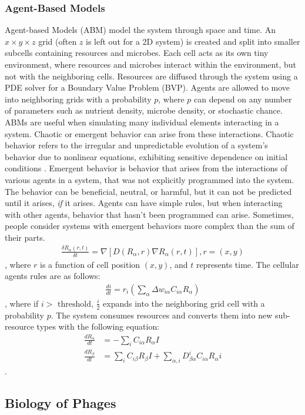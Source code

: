 \subsubsection{Agent-Based Models}
Agent-based Models (ABM) model the system through space and time.
 An $x \times y \times z$ grid (often $z$ is left out for a 2D system) is created and split into smaller subcells containing resources and microbes.
 Each cell acts as its own tiny environment, where resources and microbes interact within the environment, but not with the neighboring cells.
 Resources are diffused through the system using a PDE solver for a Boundary Value Problem (BVP).
 Agents are allowed to move into neighboring grids with a probability $p$, where $p$ can depend on any number of parameters such as nutrient density, microbe density, or stochastic chance. \newline 
ABMs are useful when simulating many individual elements interacting in a system.
 Chaotic or emergent behavior can arise from these interactions.
 Chaotic behavior refers to the irregular and unpredictable evolution of a system's behavior due to nonlinear equations, exhibiting sensitive dependence on initial conditions \cite{encyclopedia_of_physical_science_and_technology}. \newline 
Emergent behavior is behavior that arises from the interactions of various agents in a system, that was not explicitly programmed into the system.
 The behavior can be beneficial, neutral, or harmful, but it can not be predicted until it arises, \textit{if} it arises.
 Agents can have simple rules, but when interacting with other agents, behavior that hasn't been programmed can arise.
 Sometimes, people consider systems with emergent behaviors more complex than the sum of their parts. \newline
\begin{align} 
    \frac{\delta R_\alpha(r, t)}{\delta t} = \nabla \left[D \left( R_\alpha, r\right) \nabla R_\alpha \left( r, t \right) \right], r = \left(x, y\right)
\end{align}, where $r$ is a function of cell position $(x, y)$, and $t$ represents time. 
The cellular agents rules are as follows: 
\begin{align} 
    \frac{di}{dt} = r_i \left( \sum_\alpha \Delta w_{i\alpha}C_{i\alpha}R_\alpha\right)
\end{align}, where if $i> \text{ threshold, }\frac{i}{2}$ expands into the neighboring grid cell with a probability $p$. 
The system consumes resources and converts them into new sub-resource types with the following equation:
\begin{align}    
    \frac{dR_\alpha}{dt} &= -\sum_i C_{i\alpha}R_\alpha I \\
    \frac{dR_\beta}{dt} &= \sum_i C_{i\beta}R_\beta I + \sum_{\alpha, i}D_{\beta \alpha}^{i} C_{i \alpha} R_\alpha i
\end{align}. 

\subsection{Biology of Phages}